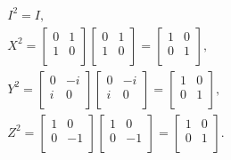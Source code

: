 \documentclass[a4paper,12pt]{article}
\begin{document}
    \begin{gather}
        \nonumber
        I^2 = I \textrm{,} \\
        \nonumber
        X^2 =
        \begin{bmatrix}
            0 & 1\\
            1 & 0\\
        \end{bmatrix}
        \begin{bmatrix}
            0 & 1\\
            1 & 0\\
        \end{bmatrix}
        =
        \begin{bmatrix}
            1 & 0\\
            0 & 1\\
        \end{bmatrix} \textrm{,} \\
        \nonumber
        Y^2 =
        \begin{bmatrix}
            0 & -i\\
            i & 0\\
        \end{bmatrix}
        \begin{bmatrix}
            0 & -i\\
            i & 0\\
        \end{bmatrix}
        =
        \begin{bmatrix}
            1 & 0\\
            0 & 1\\
        \end{bmatrix} \textrm{,} \\
        Z^2 =
        \begin{bmatrix}
            1 & 0\\
            0 & -1\\
        \end{bmatrix}
        \begin{bmatrix}
            1 & 0\\
            0 & -1\\
        \end{bmatrix}
        =
        \begin{bmatrix}
            1 & 0\\
            0 & 1\\
        \end{bmatrix} \textrm{.} \\
    \end{gather}
\end{document}
